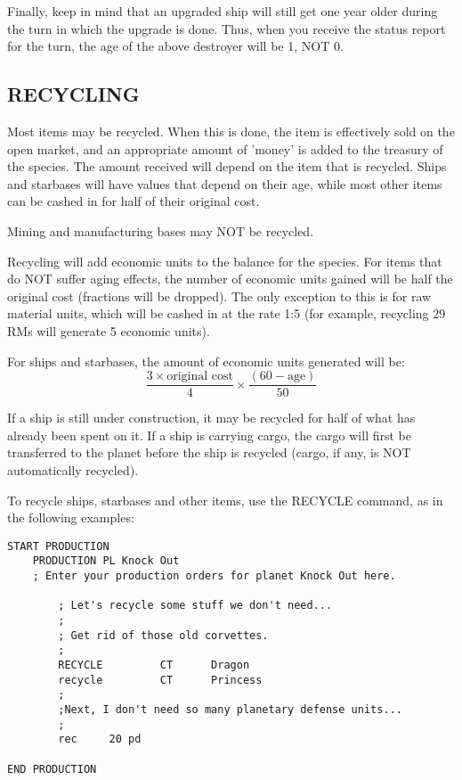 \documentclass[10pt,titlepage]{article}
\begin{document}
Finally, keep in mind that an upgraded ship will still get one year older
during the turn in which the upgrade is done.  Thus, when you receive the
status report for the turn, the age of the above destroyer will be 1, NOT 0.


\subsection{RECYCLING}
\label{sec:recycling}


Most items may be recycled.  When this is done, the item is effectively sold on
the open market, and an appropriate amount of 'money' is added to the treasury
of the species.  The amount received will depend on the item that is recycled.
Ships and starbases will have values that depend on their age, while most
other items can be cashed in for half of their original cost.

Mining and manufacturing bases may NOT be recycled.

Recycling will add economic units to the balance for the species.  For items
that do NOT suffer aging effects, the number of economic units gained will be
half the original cost (fractions will be dropped).  The only exception to
this is for raw material units, which will be cashed in at the rate 1:5 (for
example, recycling 29 RMs will generate 5 economic units).

For ships and starbases, the amount of economic units generated will be:
\[
		\dfrac{3  \times  \textrm{original cost}}{4}      \times \dfrac{(60 - \textrm{age})}{50}
\]

If a ship is still under construction, it may be recycled for half of what has
already been spent on it.  If a ship is carrying cargo, the cargo will first be
transferred to the planet before the ship is recycled (cargo, if any, is NOT
automatically recycled).

To recycle ships, starbases and other items, use the RECYCLE command, as in the
following examples:

\begin{verbatim}
START PRODUCTION
    PRODUCTION PL Knock Out
    ; Enter your production orders for planet Knock Out here.

        ; Let's recycle some stuff we don't need...
        ;
        ; Get rid of those old corvettes.
        ;
        RECYCLE         CT      Dragon
        recycle         CT      Princess
        ;
        ;Next, I don't need so many planetary defense units...
        ;
        rec     20 pd

END PRODUCTION
\end{verbatim} 
\end{document}

